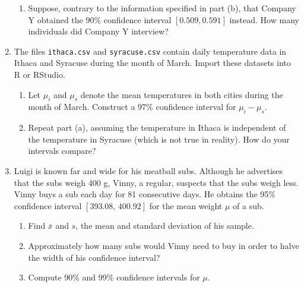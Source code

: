 \documentclass{article}    %
\begin{document}
\begin{enumerate}
\begin{enumerate}
			\item Suppose, contrary to the information specified in part (b), that Company Y obtained the $90\%$ confidence interval $[0.509,0.591]$ instead. How many individuals did Company Y interview?
		\end{enumerate}

		\item The files \texttt{ithaca.csv} and \texttt{syracuse.csv} contain daily temperature data in Ithaca and Syracuse during the month of March. Import these datasets into R or RStudio.
		\begin{enumerate}
			\item  Let $\mu_i$ and $\mu_s$ denote the mean temperatures in both cities during the month of March. Construct a $97\%$ confidence interval for $\mu_i-\mu_s$. 

			\item  Repeat part (a), assuming the temperature in Ithaca is independent of the temperature in Syracuse (which is not true in reality). How do your intervals compare?
		\end{enumerate}
		
		\item Luigi is known far and wide for his meatball subs. Although he advertises that the subs weigh 400 g, Vinny, a regular, suspects that the subs weigh less. Vinny buys a sub each day for 81 consecutive days. He obtains the 95\% confidence interval $[393.08, \, 400.92]$ for the mean weight $\mu$ of a sub.
		\begin{enumerate}
			\item Find $\bar x$ and $s$, the mean and standard deviation of his sample.

			\item  Approximately how many subs would Vinny need to buy in order to halve the width of his confidence interval?
			
			\item Compute 90\% and 99\% confidence intervals for $\mu$.
		\end{enumerate}
	\end{enumerate}
	
\end{document}
